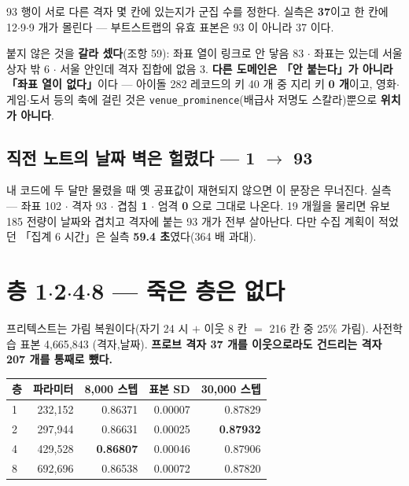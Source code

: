 \documentclass{article}
\begin{document}
{93 행이 서로 다른 격자 몇 칸에 있는지가 군집 수를 정한다. 실측은 \textbf{37}이고
한 칸에 12$\cdot$9$\cdot$9 개가 몰린다 --- 부트스트랩의 유효 표본은 93 이 아니라 37 이다.}

붙지 않은 것을 \textbf{갈라 셌다}(조항 59): 좌표 열이 링크로 안 닿음 83 $\cdot$
좌표는 있는데 서울 상자 밖 6 $\cdot$ 서울 안인데 격자 집합에 없음 3.
\textbf{다른 도메인은 「안 붙는다」가 아니라 「좌표 열이 없다」}이다 ---
아이돌 282 레코드의 키 40 개 중 지리 키 \textbf{0 개}이고,
영화$\cdot$게임$\cdot$도서 등의 축에 걸린 것은 \texttt{venue\_prominence}(배급사 저명도 스칼라)뿐으로 \textbf{위치가 아니다}.

\subsection{직전 노트의 날짜 벽은 헐렸다 --- 1 $\to$ 93}

{내 코드에 두 달만 물렸을 때 옛 공표값이 재현되지 않으면 이 문장은 무너진다.
실측 --- 좌표 102 $\cdot$ 격자 93 $\cdot$ 겹침 \textbf{1} $\cdot$ 엄격 \textbf{0} 으로 그대로 나온다.}
19 개월을 물리면 유보 185 전량이 날짜와 겹치고 격자에 붙는 93 개가 전부 살아난다.
다만 수집 계획이 적었던 「집계 6 시간」은 실측 \textbf{59.4 초}였다(364 배 과대).

\section{층 1$\cdot$2$\cdot$4$\cdot$8 --- 죽은 층은 없다}

프리텍스트는 가림 복원이다(자기 24 시 $+$ 이웃 8 칸 $=$ 216 칸 중 25\% 가림).
사전학습 표본 4{,}665{,}843 (격자,날짜).
\textbf{프로브 격자 37 개를 이웃으로라도 건드리는 격자 207 개를 통째로 뺐다.}

\begin{table}[h]\centering\small
\begin{tabular}{lrrrr}
\toprule
층 & 파라미터 & 8{,}000 스텝 & 표본 SD & 30{,}000 스텝 \\
\midrule
1 & 232{,}152 & 0.86371 & 0.00007 & 0.87829 \\
2 & 297{,}944 & 0.86631 & 0.00025 & \textbf{0.87932} \\
4 & 429{,}528 & \textbf{0.86807} & 0.00046 & 0.87906 \\
8 & 692{,}696 & 0.86538 & 0.00072 & 0.87820 \\
\bottomrule
\end{tabular}
\end{table}
\end{document}

